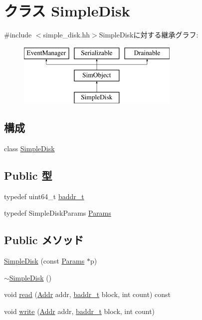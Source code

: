 \hypertarget{classSimpleDisk}{
\section{クラス SimpleDisk}
\label{classSimpleDisk}
}


{\ttfamily \#include $<$simple\_\-disk.hh$>$}SimpleDiskに対する継承グラフ:\begin{figure}[H]
\begin{center}
\leavevmode
\includegraphics[height=3cm]{classSimpleDisk}
\end{center}
\end{figure}
\subsection*{構成}
\begin{DoxyCompactItemize}
\item 
class \hyperlink{classSimpleDisk_1_1SimpleDisk}{SimpleDisk}
\end{DoxyCompactItemize}
\subsection*{Public 型}
\begin{DoxyCompactItemize}
\item 
typedef uint64\_\-t \hyperlink{classSimpleDisk_afee2ead885909c1108a7523ee536d096}{baddr\_\-t}
\item 
typedef SimpleDiskParams \hyperlink{classSimpleDisk_a65e935e8cfb2d781b38481c79c2ece76}{Params}
\end{DoxyCompactItemize}
\subsection*{Public メソッド}
\begin{DoxyCompactItemize}
\item 
\hyperlink{classSimpleDisk_afa3d068c2a6e40b01c7ea1c4cf0034b9}{SimpleDisk} (const \hyperlink{classSimpleDisk_a65e935e8cfb2d781b38481c79c2ece76}{Params} $\ast$p)
\item 
\hyperlink{classSimpleDisk_ab7cd876b3ea22d054172fb927fa2733b}{$\sim$SimpleDisk} ()
\item 
void \hyperlink{classSimpleDisk_a6e73fda5b9492c6dea33ce900e0682f7}{read} (\hyperlink{base_2types_8hh_af1bb03d6a4ee096394a6749f0a169232}{Addr} addr, \hyperlink{classSimpleDisk_afee2ead885909c1108a7523ee536d096}{baddr\_\-t} block, int count) const 
\item 
void \hyperlink{classSimpleDisk_ad6656482434fa7d0dd7496f1a70aa5ee}{write} (\hyperlink{base_2types_8hh_af1bb03d6a4ee096394a6749f0a169232}{Addr} addr, \hyperlink{classSimpleDisk_afee2ead885909c1108a7523ee536d096}{baddr\_\-t} block, int count)
\end{DoxyCompactItemize}
